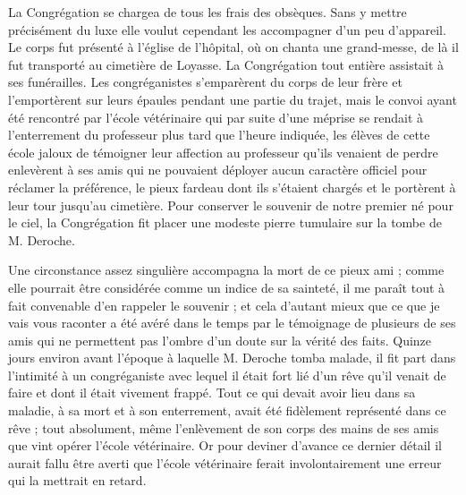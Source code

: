 La Congrégation se chargea de tous les frais des obsèques. Sans y mettre précisément du luxe elle voulut cependant les accompagner d'un peu d'appareil. Le corps fut présenté à l'église de l'hôpital, où on chanta une grand-messe, de là il fut transporté au cimetière de Loyasse. La Congrégation tout entière assistait à ses funérailles. Les congréganistes s'emparèrent du corps de leur frère et l'emportèrent sur leurs épaules pendant une partie du trajet, mais le convoi ayant été rencontré par l'école vétérinaire qui par suite d'une méprise se rendait à l'enterrement du professeur plus tard que l'heure indiquée, les élèves de cette école jaloux de témoigner leur affection au professeur qu'ils venaient de perdre enlevèrent à ses amis qui ne pouvaient déployer aucun caractère officiel
pour réclamer la préférence, le pieux fardeau dont ils s'étaient chargés et le portèrent à leur tour jusqu'au cimetière. Pour conserver le souvenir de notre premier né pour le ciel, la Congrégation fit placer une modeste pierre tumulaire sur la tombe de M. Deroche.

Une circonstance assez singulière accompagna la mort de ce pieux ami ; comme elle pourrait être considérée comme un indice de sa sainteté, il me paraît tout à fait convenable d'en rappeler le souvenir ; et cela d'autant mieux que ce que je vais vous raconter a été avéré dans le temps par le témoignage de plusieurs de ses amis qui ne permettent pas l'ombre d'un doute sur la vérité des faits. Quinze jours environ avant l'époque à laquelle M. Deroche tomba malade, il fit part dans l'intimité à un congréganiste avec lequel il était fort lié d'un rêve qu'il venait de faire et dont il était vivement frappé. Tout ce qui devait avoir lieu dans sa maladie, à sa mort et à son enterrement, avait été fidèlement représenté dans ce rêve ; tout absolument, même l'enlèvement de son corps des mains de ses amis que vint opérer l'école vétérinaire. Or pour deviner d'avance ce dernier détail il aurait fallu être averti que l'école vétérinaire ferait involontairement une erreur qui la mettrait en retard.

